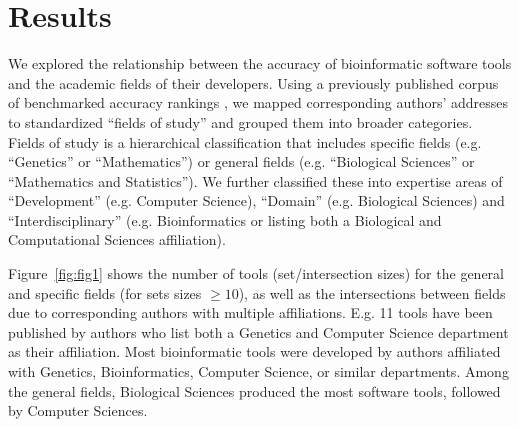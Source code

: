 \documentclass[fleqn,10pt,doc,onecolumn]{SelfArx}%
\begin{document}
\section*{Results}

We explored the relationship between the accuracy of bioinformatic
software tools and the academic fields of their developers. Using a
previously published corpus of benchmarked accuracy rankings
\cite{gardner2024}, we mapped corresponding authors' addresses to
standardized ``fields of study'' \cite{fields2014} and grouped them
into broader categories. Fields of study is a hierarchical
classification that includes specific fields (e.g. ``Genetics'' or
``Mathematics'') or general fields (e.g. ``Biological Sciences'' or
``Mathematics and Statistics''). We further classified these into
expertise areas of ``Development'' (e.g. Computer Science), ``Domain''
(e.g. Biological Sciences) and ``Interdisciplinary''
(e.g. Bioinformatics or listing both a Biological and Computational
Sciences affiliation).

%
\textcolor{rv}{Figure~\ref{fig:fig1} shows the number of tools (set/intersection sizes) for the general
and specific fields (for sets sizes $\ge 10$), as well as the intersections between
fields due to corresponding authors with multiple
affiliations. E.g. 11 tools have been published by authors who list
both a Genetics and Computer Science department as their
affiliation.} Most bioinformatic tools were developed by authors
affiliated with Genetics, Bioinformatics, Computer Science, or similar
departments. Among the general fields, Biological Sciences produced
the most software tools, followed by Computer Sciences.
\end{document}
